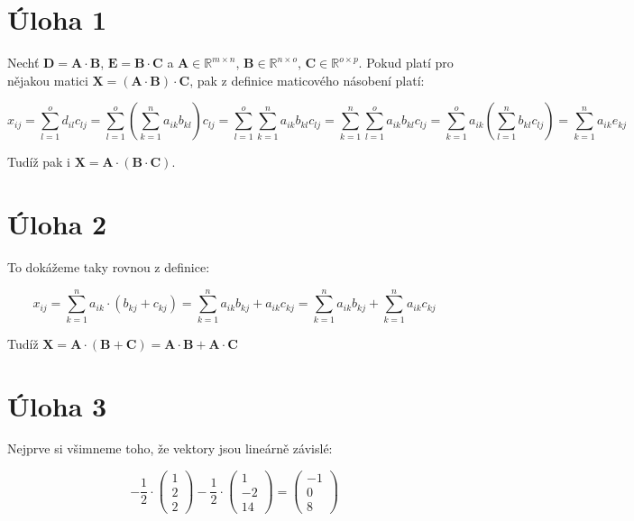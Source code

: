 \documentclass{fkssolpub}
\author{Ondřej Sedláček}
\begin{document}
\section{Úloha 1}

Nechť $\mathbf{D} = \mathbf{A} \cdot \mathbf{B}$, $\mathbf{E} = \mathbf{B} \cdot \mathbf{C}$ a $\mathbf{A} \in \mathbb{R}^{m \times n}$, $\mathbf{B} \in \mathbb{R}^{n \times o}$, $\mathbf{C} \in \mathbb{R}^{o \times p}$. Pokud platí pro nějakou matici $\mathbf{X} = (\mathbf{A} \cdot \mathbf{B}) \cdot \mathbf{C}$, pak z definice maticového násobení platí:

\[
	x_{ij} = \sum_{l = 1}^o d_{il} c_{lj} = \sum_{l = 1}^o \left( \sum_{k = 1}^n a_{ik} b_{kl} \right) c_{lj} = \sum_{l = 1}^o \sum_{k = 1}^n a_{ik} b_{kl} c_{lj} = \sum_{k = 1}^n \sum_{l = 1}^o a_{ik} b_{kl} c_{lj} = \sum_{k = 1}^o a_{ik} \left( \sum_{l = 1}^n b_{kl} c_{lj} \right) = \sum_{k = 1}^n a_{ik} e_{kj}
\]

Tudíž pak i $\mathbf{X} = \mathbf{A} \cdot (\mathbf{B} \cdot \mathbf{C})$.

\section{Úloha 2}

To dokážeme taky rovnou z definice:

\[
	x_{ij} = \sum_{k = 1}^n a_{ik} \cdot (b_{kj} + c_{kj}) = \sum_{k = 1}^n a_{ik} b_{kj} +a_{ik} c_{kj} = \sum_{k = 1}^n a_{ik} b_{kj} + \sum_{k = 1}^n a_{ik} c_{kj}
\]

Tudíž $\mathbf{X} = \mathbf{A} \cdot (\mathbf{B} + \mathbf{C}) = \mathbf{A} \cdot \mathbf{B} + \mathbf{A} \cdot \mathbf{C}$

\section{Úloha 3}

Nejprve si všimneme toho, že vektory jsou lineárně závislé:

\[
	- \frac{1}{2} \cdot\begin{pmatrix}
		1 \\ 2 \\ 2
	\end{pmatrix} - \frac{1}{2} \cdot
	\begin{pmatrix}
		1 \\ -2 \\ 14
	\end{pmatrix} =
	\begin{pmatrix}
		-1 \\ 0 \\ 8
	\end{pmatrix}
\]
\end{document}
